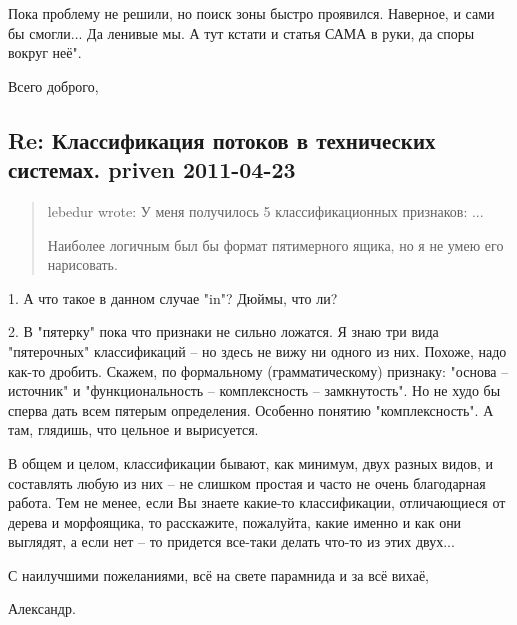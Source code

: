 \documentclass[a4paper,11pt]{article}
\begin{document}
Пока проблему не решили, но поиск зоны быстро проявился. Наверное, и сами бы
смогли... Да ленивые мы. А тут кстати и статья САМА в руки, да споры вокруг
неё".

Всего доброго,

\subsection*{Re: Классификация потоков в технических системах.  priven
  2011-04-23}

\begin{quote}
  lebedur wrote: У меня получилось 5 классификационных признаков: ...

  Наиболее логичным был бы формат пятимерного ящика, но я не умею его
  нарисовать.
\end{quote}
1. А что такое в данном случае "in"? Дюймы, что ли?

2. В "пятерку" пока что признаки не сильно ложатся. Я знаю три вида
"пятерочных" классификаций -- но здесь не вижу ни одного из них. Похоже, надо
как-то дробить. Скажем, по формальному (грамматическому) признаку: "основа --
источник" и "функциональность -- комплексность -- замкнутость". Но не худо бы
сперва дать всем пятерым определения. Особенно понятию "комплексность". А там,
глядишь, что цельное и вырисуется.

В общем и целом, классификации бывают, как минимум, двух разных видов, и
составлять любую из них -- не слишком простая и часто не очень благодарная
работа. Тем не менее, если Вы знаете какие-то классификации, отличающиеся от
дерева и морфоящика, то расскажите, пожалуйта, какие именно и как они
выглядят, а если нет -- то придется все-таки делать что-то из этих двух...

С наилучшими пожеланиями, всё на свете парамнида и за всё вихаё,

Александр.
\end{document}
